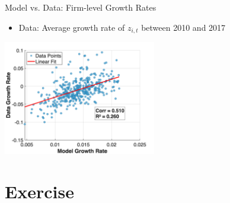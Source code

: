 \documentclass[
  10pt,
  aspectratio=169,   %
]{beamer}
\theoremstyle{plain}
\begin{document}
\begin{frame}{Model vs. Data: Firm-level Growth Rates}
  \begin{itemize}
    \item Data: Average growth rate of $z_{i,t}$ between 2010 and 2017
  \end{itemize}
  \medskip{}
  \begin{center}
    \includegraphics[width=0.5\textwidth]{figures/NO_growth_rate_comparison.png}
  \end{center}
\end{frame}

\section{Exercise}
\end{document}
